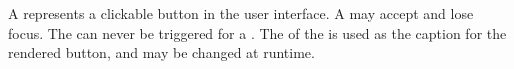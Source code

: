 A  represents a clickable button in the user interface. A  may accept and lose focus. The   can never be triggered for a . The  of the  is used as the caption for the rendered button, and may be changed at runtime.
